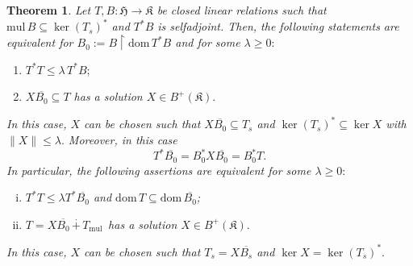 \documentclass{amsart}
\newtheorem{theorem}{Theorem}[section]
\newcommand{\n}{\|}
\newcommand{\h}{\mathfrak{H}}
\newcommand{\kk}{\mathfrak{K}}
\newcommand{\mul}{\mathrm{mul} \, }
\newcommand{\D}{\mathrm{dom}\,}
\newcommand{\DT}{\mathrm{dom}\,T }
\newcommand{\adj}{^*}
\newcommand{\ts}{T_s}
\newcommand{\tstar}{T^{*}}
\newcommand{\inclu}{\subseteq}
\newcommand{\lplusk}{B^{+}(\kk)}
\newcommand{\rest}{\upharpoonright}
\numberwithin{equation}{section}
\renewcommand{\labelenumi}{(\arabic{enumi})}
\begin{document}
\begin{theorem}\label{relationtheo}
  Let $T, B: \h\rightarrow \kk$ be closed linear relations such that
$\mul B \subseteq \ker (\ts)\adj$ and   $\tstar B $ is selfadjoint.
Then, the following statements are equivalent  for $B_0:= B \rest \D \tstar B$ and for  some $\lambda \geq  0:$
 \begin{enumerate}\def\labelenumi{\rm(\roman{enumi})}
     \item $T^* T  \leq \lambda \, \tstar B ;$
     \item $  X \overline{B_0}\inclu T   $ has a solution $X \in \lplusk.$
          \end{enumerate}
 In this case, $X$ can be chosen such that $X\overline{B_0}  \inclu T_s$ and $ \ker (\ts)\adj \inclu \ker X$ with $\n X \n \leq \lambda.$ Moreover, in this case
      \begin{equation}\label{hawnha}
        \tstar \overline{B_0} =  B_0 \adj X \overline{B_0}= B_0\adj T.
      \end{equation}
 In particular, the following assertions are equivalent for some $\lambda \geq 0:$
   \begin{enumerate}[i)]\def\labelenumi{\rm(\roman{enumi})}\setcounter{enumi}{2}
     \item $T^* T  \leq \lambda \tstar \overline{B_0}$ and $\DT  \inclu \D \overline{B_0}$;
     \item $T=X\overline{B_0}\,\overset{.}{+}\, T_{\mul}$ has a solution $X \in \lplusk.$
      \end{enumerate}
      In this case, $X$ can be chosen such that $T_s=X\overline{B_s}$ and $\ker X =\ker (\ts)\adj.$
\end{theorem}
\end{document}
